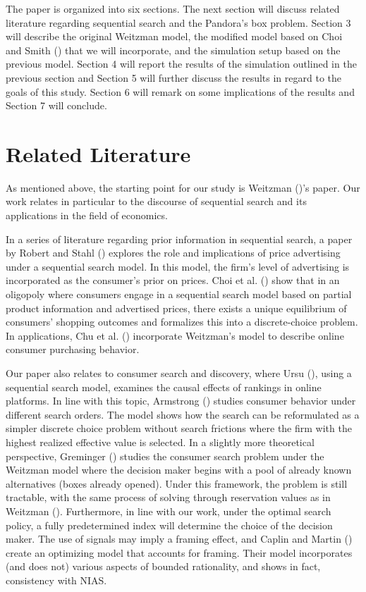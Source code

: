 \documentclass[12pt]{article}
\begin{document}
The paper is organized into six sections. The next section will discuss related literature regarding sequential search and the Pandora's box problem. Section 3 will describe the original Weitzman model, the modified model based on Choi and Smith (\citeyear{Choi}) that we will incorporate, and the simulation setup based on the previous model. Section 4 will report the results of the simulation outlined in the previous section and Section 5 will further discuss the results in regard to the goals of this study. Section 6 will remark on some implications of the results and Section 7 will conclude.

\section{Related Literature}
As mentioned above, the starting point for our study is Weitzman (\citeyear{weitzman})'s paper. Our work relates in particular to the discourse of sequential search and its applications in the field of economics. 

In a series of literature regarding prior information in sequential search, a paper by Robert and Stahl (\citeyear{robert}) explores the role and implications of price advertising under a sequential search model. In this model, the firm's level of advertising is incorporated as the consumer's prior on prices. Choi et al. (\citeyear{choietal}) show that in an oligopoly where consumers engage in a sequential search model based on partial product information and advertised prices, there exists a unique equilibrium of consumers' shopping outcomes and formalizes this into a discrete-choice problem. In applications, Chu et al. (\citeyear{Chu2017}) incorporate Weitzman's model to describe online consumer purchasing behavior. 

Our paper also relates to consumer search and discovery, where Ursu (\citeyear{Ursu2015}), using a sequential search model, examines the causal effects of rankings in online platforms. In line with this topic, Armstrong (\citeyear{armstrong}) studies consumer behavior under different search orders. The model shows how the search can be reformulated as a simpler discrete choice problem without search frictions where the firm with the highest realized effective value is selected. In a slightly more theoretical perspective, Greminger (\citeyear{Greminger2022}) studies the consumer search problem under the Weitzman model where the decision maker begins with a pool of already known alternatives (boxes already opened). Under this framework, the problem is still tractable, with the same process of solving through reservation values as in Weitzman (\citeyear{weitzman}). Furthermore, in line with our work, under the optimal search policy, a fully predetermined index will determine the choice of the decision maker. The use of signals may imply a framing effect, and Caplin and Martin (\citeyear{caplin}) create an optimizing model that accounts for framing. Their model incorporates (and does not) various aspects of bounded rationality, and shows in fact, consistency with NIAS.
\end{document}
